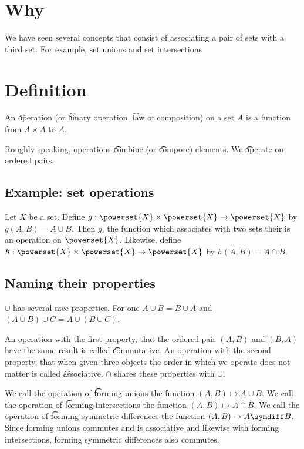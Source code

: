 

\section*{Why}

We have seen several concepts that consist of associating a pair of sets with a third set.
For example, set unions and set intersections

\section*{Definition}

An \t{operation} (or \t{binary operation}, \t{law of composition}) on a set $A$ is a function from $A \times  A$ to $A$.

Roughly speaking, operations \t{combine} (or \t{compose}) elements.
We \t{operate} on ordered pairs.

\subsection*{Example: set operations}

Let $X$ be a set.
Define $g: \powerset{X} \times  \powerset{X} \to \powerset{X}$ by $g(A, B) = A \cup B$.
Then $g$, the function which associates with two sets their is an operation on $\powerset{X}$.
Likewise, define $h : \powerset{X} \times  \powerset{X} \to \powerset{X}$ by $h(A, B) = A \cap  B$.

\subsection*{Naming their properties}

$\cup$ has several nice properties.
For one $A \cup B = B \cup A$ and $(A \cup B) \cup C = A \cup (B \cup C)$.

An operation with the first property, that the ordered pair $(A, B)$ and $(B, A)$ have the same result is called \t{commutative}.
An operation with the second property, that when given three objects the order in which we operate does not matter is called \t{associative}.
$\cap $ shares these properties with $\cup$.

We call the operation of \t{forming unions} the function $(A, B) \mapsto A \cup B$.
We call the operation of \t{forming intersections} the function $(A, B) \mapsto A \cap  B$.
We call the operation of \t{forming symmetric differences} the function $(A, B) \mapsto A \symdiff B$.
Since forming unions commutes and is associative and likewise with forming intersections, forming symmetric differences also commutes.

